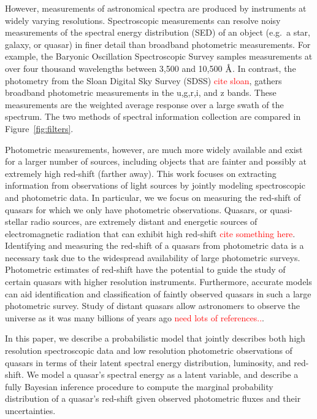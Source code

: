 \documentclass{article}
\newcommand{\angstrom}{\textup{\AA}}
\newcommand{\red}[1]{\textcolor{red}{#1}}
\begin{document}
However, measurements of astronomical spectra are produced by instruments at widely varying resolutions.  
Spectroscopic measurements can resolve noisy measurements of the spectral energy distribution (SED) of an object (e.g.~a star, galaxy, or quasar) in finer detail than broadband photometric measurements.  For example, the Baryonic Oscillation Spectroscopic Survey \cite{dawson2013baryon} samples measurements at over four thousand wavelengths between 3,500 and 10,500 $\angstrom$.  In contrast, the photometry from the Sloan Digital Sky Survey (SDSS) \red{cite sloan}, gathers broadband photometric measurements in the u,g,r,i, and z bands.  These measurements are the weighted average response over a large swath of the spectrum.  The two methods of spectral information collection are compared in Figure~\ref{fig:filters}. 

Photometric measurements, however, are much more widely available and exist for a larger number of sources, including objects that are fainter and possibly at extremely high red-shift (farther away).  This work focuses on extracting information from observations of light sources by jointly modeling spectroscopic and photometric data.  In particular, we we focus on measuring the red-shift of quasars for which we only have photometric observations.  Quasars, or quasi-stellar radio sources, are extremely distant and energetic sources of electromagnetic radiation that can exhibit high red-shift \red{cite something here}.  Identifying and measuring the red-shift of a quasars from photometric data is a necessary task due to the widespread availability of large photometric surveys.  Photometric estimates of red-shift have the potential to guide the study of certain quasars with higher resolution instruments.  Furthermore, accurate models can aid identification and classification of faintly observed quasars in such a large photometric survey.  Study of distant quasars allow astronomers to observe the universe as it was many billions of years ago \red{need lots of references..}. 

In this paper, we describe a probabilistic model that jointly describes both high resolution spectroscopic data and low resolution photometric observations of quasars in terms of their latent spectral energy distribution, luminosity, and red-shift.  We model a quasar's spectral energy as a latent variable, and describe a fully Bayesian inference procedure to compute the marginal probability distribution of a quasar's red-shift given observed photometric fluxes and their uncertainties. 
\end{document}
